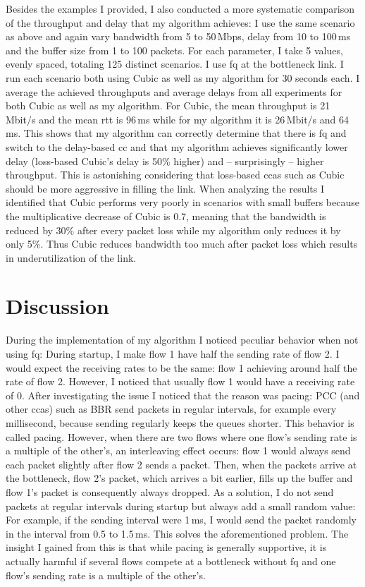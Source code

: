 \documentclass[conference]{IEEEtran}
\begin{document}
Besides the examples I provided, I also conducted a more systematic comparison of the throughput and delay that my algorithm achieves: I use the same scenario as above and again vary bandwidth from 5 to 50\,Mbps, delay from 10 to 100\,ms and the buffer size from 1 to 100 packets. For each parameter, I take 5 values, evenly spaced, totaling 125 distinct scenarios. I use \gls{fq} at the bottleneck link. I run each scenario both using Cubic as well as my algorithm for 30 seconds each. I average the achieved throughputs and average delays from all experiments for both Cubic as well as my algorithm. For Cubic, the mean throughput is 21\,Mbit/s and the mean \gls{rtt} is 96\,ms while for my algorithm it is 26\,Mbit/s and 64\,ms. This shows that my algorithm can correctly determine that there is \gls{fq} and switch to the delay-based \gls{cc} and that my algorithm achieves significantly lower delay (loss-based Cubic's delay is 50\% higher) and -- surprisingly -- higher throughput. This is astonishing considering that loss-based \glspl{cca} such as Cubic should be more aggressive in filling the link. When analyzing the results I identified that Cubic performs very poorly in scenarios with small buffers because the multiplicative decrease of Cubic is 0.7, meaning that the bandwidth is reduced by 30\% after every packet loss while my algorithm only reduces it by only 5\%. Thus Cubic reduces bandwidth too much after packet loss which results in underutilization of the link. 

\section{Discussion}

During the implementation of my algorithm I noticed peculiar behavior when not using \gls{fq}: During startup, I make flow 1 have half the sending rate of flow 2. I would expect the receiving rates to be the same: flow 1 achieving around half the rate of flow 2. However, I noticed that usually flow 1 would have a receiving rate of 0. After investigating the issue I noticed that the reason was pacing: PCC (and other \glspl{cca}) such as BBR send packets in regular intervals, for example every millisecond, because sending regularly keeps the queues shorter. This behavior is called pacing. However, when there are two flows where one flow's sending rate is a multiple of the other's, an interleaving effect occurs: flow 1 would always send each packet slightly after flow 2 sends a packet. Then, when the packets arrive at the bottleneck, flow 2's packet, which arrives a bit earlier, fills up the buffer and flow 1's packet is consequently always dropped. As a solution, I do not send packets at regular intervals during startup but always add a small random value: For example, if the sending interval were 1\,ms, I would send the packet randomly in the interval from 0.5 to 1.5\,ms. This solves the aforementioned problem. The insight I gained from this is that while pacing is generally supportive, it is actually harmful if several flows compete at a bottleneck without \gls{fq} and one flow's sending rate is a multiple of the other's.
\end{document}
